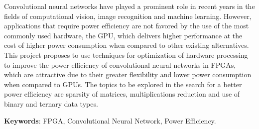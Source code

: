 \documentclass[
    12pt,                       %
    oneside,                    %
    a4paper,                    %
    brazil,                     %
    french,                     %
    spanish,                    %
    english,                    %
    ]{abntex2}
\begin{document}

\frenchspacing


\imprimircapa

\imprimirfolhaderosto



\begin{resumo}
     Convolutional neural networks have played a prominent role in recent years in the fields of computational vision, image recognition and machine learning.
     However, applications that require power efficiency are not favored by the use of the most commonly used hardware, the GPU, which delivers higher performance at the cost of higher power consumption when compared to other existing alternatives.
     This project proposes to use techniques for optimization of hardware processing to improve the power efficiency of convolutional neural networks in FPGAs, which are attractive due to their greater flexibility and lower power consumption when compared to GPUs.
     The topics to be explored in the search for a better power efficiency are sparsity of matrices, multiplications reduction and use of binary and ternary data types.

   \vspace{\onelineskip}
   \noindent
   \textbf{Keywords}: FPGA, Convolutional Neural Network, Power Efficiency.
\end{resumo}
\end{document}
